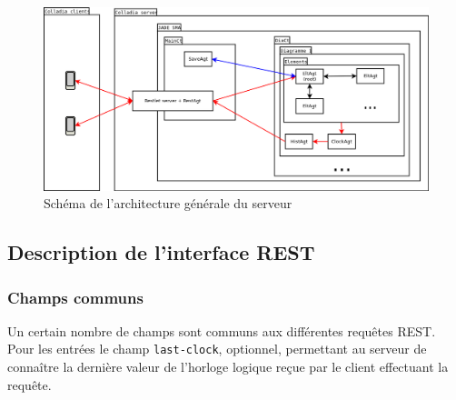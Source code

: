 \vspace*{\fill}
\begin{figure}[!h]
	\begin{center}
	\includegraphics[width=.9\textwidth]{img/general_server}
	\caption{Schéma de l'architecture générale du serveur}
	\vspace*{-.5cm}
	\end{center}
\end{figure}

\subsection{Description de l'interface REST}
\subsubsection{Champs communs}
Un certain nombre de champs sont communs aux différentes requêtes REST.
Pour les entrées le champ \lstinline$last-clock$, optionnel, permettant au serveur de connaître la dernière valeur de l'horloge logique reçue par le client effectuant la requête.

